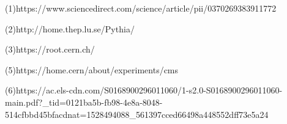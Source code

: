 \documentclass{article}		%
\begin{document}



\pagebreak
(1)https://www.sciencedirect.com/science/article/pii/0370269383911772
  
(2)http://home.thep.lu.se/Pythia/
 
(3)https://root.cern.ch/ 
 
 
 (5)https://home.cern/about/experiments/cms
 
(6)https://ac.els-cdn.com/S0168900296011060/1-s2.0-S0168900296011060-main.pdf?_tid=0121ba5b-fb98-4e8a-8048-514cfbbd45bfacdnat=1528494088_561397cced66498a448552dff73e5a24 
 
 
\end{document}
